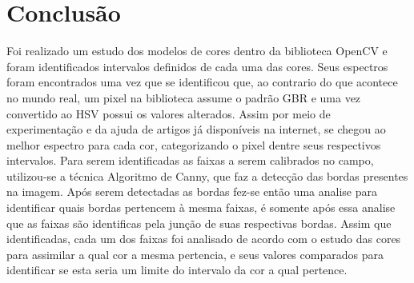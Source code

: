 
\chapter{Conclusão} \label{Cap:Conclusao}


	Foi realizado um estudo dos modelos de cores dentro da biblioteca OpenCV e foram identificados intervalos definidos de cada uma das cores. Seus espectros foram encontrados uma vez que se identificou que, ao contrario do que acontece no mundo real, um pixel na biblioteca assume o  padrão GBR e uma vez convertido ao HSV possui os valores alterados. Assim por meio de experimentação e da ajuda de artigos já disponíveis na internet, se chegou ao melhor espectro para cada cor, categorizando o pixel dentre seus respectivos intervalos. Para serem identificadas as faixas a serem calibrados no campo, utilizou-se a técnica Algoritmo de Canny, que faz a detecção das bordas presentes na imagem. Após serem detectadas as bordas fez-se então uma analise para identificar quais bordas pertencem à mesma faixas, é somente após essa analise que as faixas são identificas pela junção de suas respectivas bordas. Assim que identificadas, cada um dos faixas foi analisado de acordo com o estudo das cores para assimilar a qual cor a mesma pertencia, e seus valores comparados para identificar se esta seria um limite do intervalo da cor a qual pertence.


